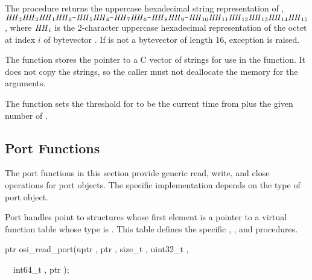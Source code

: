 The  procedure returns the uppercase hexadecimal
string representation of ,
$\var{HH}_3\var{HH}_2\var{HH}_1\var{HH}_0\code{-}\var{HH}_5\var{HH}_4\code{-}\var{HH}_7\var{HH}_6\code{-}\var{HH}_8\var{HH}_9\code{-}\var{HH}_{10}\var{HH}_{11}\var{HH}_{12}\var{HH}_{13}\var{HH}_{14}\var{HH}_{15}$,
where $\var{HH}_i$ is the 2-character uppercase hexadecimal
representation of the octet at index $i$ of bytevector .  If
 is not a bytevector of length 16, exception
 is raised.

\begin{function}
\end{function}

The  function stores the  pointer to a
C vector of  strings for use in the 
function. It does not copy the strings, so the caller must not
deallocate the memory for the arguments.

\begin{function}
\end{function}

The  function sets the threshold for
 to be the current time from
 plus the given number of .

\subsection {Port Functions}

The port functions in this section provide generic read, write, and
close operations for port objects. The specific implementation depends
on the type of port object.

Port handles point to structures whose first element is a pointer to a
virtual function table whose type is . This
table defines the specific , , and 
procedures.

\begin{function}
\codebegin
ptr osi\_read\_port(uptr , ptr , size\_t , uint32\_t ,\strut
       \     \      int64\_t , ptr );\strut
\codeend
\end{function}


